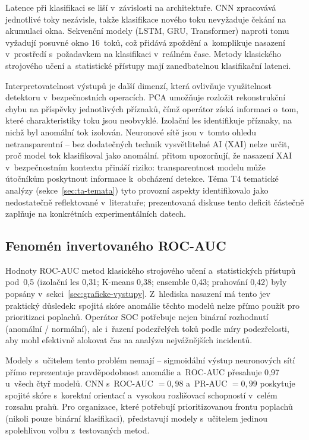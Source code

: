 Latence při klasifikaci se liší v~závislosti na architektuře. CNN zpracovává jednotlivé toky nezávisle, takže klasifikace nového toku nevyžaduje čekání na akumulaci okna. Sekvenční modely (LSTM, GRU, Transformer) naproti tomu vyžadují posuvné okno 16~toků, což přidává zpoždění a~komplikuje nasazení v~prostředí s~požadavkem na klasifikaci v~reálném čase. Metody klasického strojového učení a~statistické přístupy mají zanedbatelnou klasifikační latenci.

Interpretovatelnost výstupů je další dimenzí, která ovlivňuje využitelnost detektoru v~bezpečnostních operacích. PCA umožňuje rozložit rekonstrukční chybu na příspěvky jednotlivých příznaků, čímž operátor získá informaci o~tom, které charakteristiky toku jsou neobvyklé. Izolační les identifikuje příznaky, na nichž byl anomální tok izolován. Neuronové sítě jsou v~tomto ohledu netransparentní -- bez dodatečných technik vysvětlitelné AI (XAI) nelze určit, proč model tok klasifikoval jako anomální. \textcite{Capuano2022} přitom upozorňují, že nasazení XAI v~bezpečnostním kontextu přináší riziko: transparentnost modelu může útočníkům poskytnout informace k~obcházení detekce. Téma T4 tematické analýzy (sekce~\ref{sec:ta-temata}) tyto provozní aspekty identifikovalo jako nedostatečně reflektované v~literatuře; prezentovaná diskuse tento deficit částečně zaplňuje na konkrétních experimentálních datech.

\subsection{Fenomén invertovaného ROC-AUC}
\label{sec:diskuse-roc}

Hodnoty ROC-AUC metod klasického strojového učení a~statistických přístupů pod~0{,}5 (izolační les 0{,}31; K-means 0{,}38; ensemble 0{,}43; prahování 0{,}42) byly popsány v~sekci~\ref{sec:graficke-vystupy}. Z~hlediska nasazení má tento jev praktický důsledek: spojitá skóre anomálie těchto modelů nelze přímo použít pro prioritizaci poplachů. Operátor SOC potřebuje nejen binární rozhodnutí (anomální / normální), ale i~řazení podezřelých toků podle míry podezřelosti, aby mohl efektivně alokovat čas na analýzu nejvážnějších incidentů.

Modely s~učitelem tento problém nemají -- sigmoidální výstup neuronových sítí přímo reprezentuje pravděpodobnost anomálie a~ROC-AUC přesahuje 0{,}97 u~všech čtyř modelů. CNN s~ROC-AUC $= 0{,}98$ a~PR-AUC $= 0{,}99$ poskytuje spojité skóre s~korektní orientací a~vysokou rozlišovací schopností v~celém rozsahu prahů. Pro organizace, které potřebují prioritizovanou frontu poplachů (nikoli pouze binární klasifikaci), představují modely s~učitelem jedinou spolehlivou volbu z~testovaných metod.


